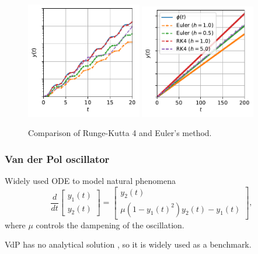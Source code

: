 \documentclass[t]{beamer}
\begin{document}
\begin{frame}
    \begin{figure}[h]
	\vspace{.1\textheight}
	\centering
	\includegraphics[width=0.45\textwidth]{../images/ode_solver_comparison_zoom.pdf}
	\includegraphics[width=0.45\textwidth]{../images/ode_solver_comparison.pdf}
	\caption{Comparison of Runge-Kutta 4 and Euler's method.}
	\label{fig:ode_comparison}
    \end{figure}
\end{frame}

\begin{frame}
    \frametitle{Van der Pol oscillator}
    Widely used ODE to model natural phenomena \[
    \frac{d}{dt}\begin{bmatrix} y_1\left( t \right) \\ y_2\left( t \right)  \end{bmatrix} = \begin{bmatrix} 
y_2\left( t \right) \\
\mu\left( 1-y_1\left( t \right) ^2 \right) y_2\left( t \right) - y_1(t)
\end{bmatrix} 
    ,\] where $\mu$ controls the dampening of the oscillation.

    VdP has no analytical solution \cite{panayotounakos_lack_2003}, so it is widely used as a benchmark.
\end{frame}
\end{document}
